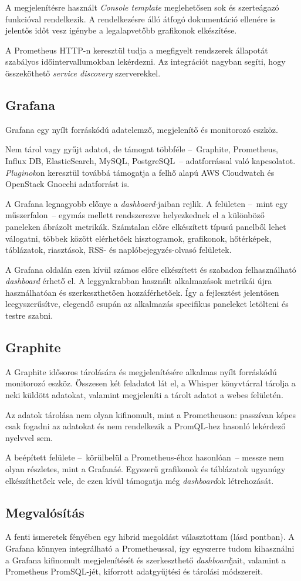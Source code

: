 A megjelenítésre használt \emph{Console template} meglehetősen sok és szerteágazó funkcióval rendelkezik. A rendelkezésre álló átfogó dokumentáció ellenére is jelentős időt vesz igénybe a legalapvetőbb grafikonok elkészítése.

A Prometheus HTTP-n keresztül tudja a megfigyelt rendszerek állapotát szabályos időintervallumokban lekérdezni. Az integrációt nagyban segíti, hogy összeköthető \emph{service discovery} szerverekkel.

\subsection{Grafana}
Grafana egy nyílt forráskódú adatelemző, megjelenítő és monitorozó eszköz.

Nem tárol vagy gyűjt adatot, de támogat többféle --~Graphite, Prometheus, Influx DB, ElasticSearch, MySQL, PostgreSQL~--   adatforrással való kapcsolatot. \emph{Pluginok}on keresztül továbbá támogatja a felhő alapú AWS Cloudwatch és OpenStack Gnocchi adatforrást is.


A Grafana legnagyobb előnye a \emph{dashboard}-jaiban rejlik. A felületen --~mint egy műszerfalon~-- egymás mellett rendszerezve helyezkednek el a különböző paneleken ábrázolt metrikák. Számtalan előre elkészített típusú panelből lehet válogatni, többek között elérhetőek hisztogramok, grafikonok, hőtérképek, táblázatok, riasztások, RSS- és naplóbejegyzés-olvasó felületek.

A Grafana oldalán ezen kívül számos előre elkészített és szabadon felhasználható \emph{dashboard} érhető el. A leggyakrabban használt alkalmazások metrikái újra használhatóan és szerkeszthetően hozzáférhetőek. Így a fejlesztést jelentősen leegyszerűsítve, elegendő csupán az alkalmazás specifikus paneleket letölteni és testre szabni.

\subsection{Graphite}
A Graphite idősoros tárolására és megjelenítésére alkalmas nyílt forráskódú monitorozó eszköz. Összesen két feladatot lát el, a Whisper könyvtárral tárolja a neki küldött adatokat, valamint megjeleníti a tárolt adatot a webes felületén.

Az adatok tárolása nem olyan kifinomult, mint a Prometheuson: passzívan képes csak fogadni az adatokat és nem rendelkezik a PromQL-hez hasonló lekérdező nyelvvel sem.

A beépített felülete --~körülbelül a Prometheus-éhoz hasonlóan~--   messze nem olyan részletes, mint a Grafanáé. Egyszerű grafikonok és táblázatok ugyanúgy elkészíthetőek vele, de ezen kívül támogatja még \emph{dashboard}ok létrehozását.


\subsection{Megvalósítás}
A fenti ismeretek fényében egy hibrid megoldást választottam (lásd  pontban). A Grafana könnyen integrálható a Prometheussal, így egyszerre tudom kihasználni a Grafana kifinomult megjelenítését és szerkeszthető \emph{dashboard}jait, valamint a Prometheus PromSQL-jét, kiforrott adatgyűjtési és tárolási módszereit.